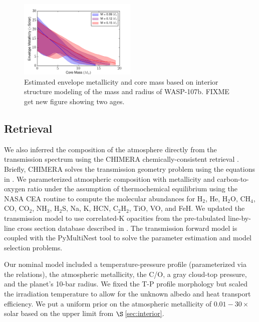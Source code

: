 \documentclass[twocolumn]{aastex61}
\begin{document}
\begin{figure}
\includegraphics[width = 0.5\textwidth]{Figures/metalByMass.png}
\caption{Estimated envelope metallicity and core mass based on interior structure modeling of the mass and radius of WASP-107b. FIXME get new figure showing two ages.}
\label{fig:metal_prior}
\end{figure}

\subsection{Retrieval}
\label{sec:retrieval}
We also inferred the composition of the atmosphere directly from the transmission spectrum using the CHIMERA chemically-consistent retrieval \citep{line13a, kreidberg15b}.   Briefly, CHIMERA solves the transmission geometry problem using the equations in \cite{brown01, tinetti12}.  We parameterized atmospheric composition with metallicity and carbon-to-oxygen ratio under the assumption of thermochemical equilibrium using the NASA CEA routine \citep{gordon94} to compute the molecular abundances for H$_2$, He, H$_2$O, CH$_4$, CO, CO$_2$, NH$_3$, H$_2$S, Na, K, HCN, C$_2$H$_2$, TiO, VO, and FeH.    We updated the transmission model to use correlated-K opacities \citep{lacis91, molliere15, amundsen16} from the pre-tabulated line-by-line cross section database described in \cite{freedman14}. The transmission forward model is coupled with the PyMultiNest tool \citep{buchner16} to solve the parameter estimation and model selection problems.  

Our nominal model included a temperature-pressure profile (parameterized via the \citealt{guillot10} relations), the atmospheric metallicity, the C/O, a gray cloud-top pressure, and the planet's 10-bar radius.  We fixed the T-P profile morphology but scaled the irradiation temperature to allow for the unknown albedo and heat transport efficiency.  We put a uniform prior on the atmospheric metallicity of $0.01 - 30\times$ solar based on the upper limit from $\S$\,\ref{sec:interior}.  

\end{document}
